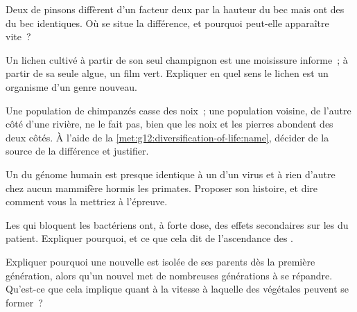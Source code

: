 \begin{exercise}[$\star\star$]\label{exo:g12:diversification-of-life:9}
Deux  de pinsons diffèrent d'un facteur deux par la hauteur du
bec mais ont des  du bec identiques. Où se situe la différence, et
pourquoi peut-elle apparaître vite~?
\end{exercise}

\begin{exercise}[$\star\star$]\label{exo:g12:diversification-of-life:10}
Un lichen cultivé à partir de son seul champignon est une moisissure
informe~; à partir de sa seule algue, un film vert. Expliquer en quel
sens le lichen est un organisme d'un genre nouveau.
\end{exercise}

\begin{exercise}[$\star\star$]\label{exo:g12:diversification-of-life:11}
Une population de chimpanzés casse des noix~; une population voisine,
de l'autre côté d'une rivière, ne le fait pas, bien que les noix et les
pierres abondent des deux côtés. À l'aide de la
\cref{met:g12:diversification-of-life:name}, décider de la source de la
différence et justifier.
\end{exercise}

\begin{exercise}[$\star\star\star$]\label{exo:g12:diversification-of-life:12}
Un  du génome humain est presque identique à un  d'un virus et
à rien d'autre chez aucun mammifère hormis les primates. Proposer son
histoire, et dire comment vous la mettriez à l'épreuve.
\end{exercise}

\begin{exercise}[$\star\star\star$]\label{exo:g12:diversification-of-life:13}
Les  qui bloquent les  bactériens ont, à forte
dose, des effets secondaires sur les  du patient.
Expliquer pourquoi, et ce que cela dit de l'ascendance des
.
\end{exercise}

\begin{exercise}[$\star\star\star$]\label{exo:g12:diversification-of-life:14}
Expliquer pourquoi une nouvelle   est isolée de ses
parents dès la première génération, alors qu'un nouvel  met de
nombreuses générations à se répandre. Qu'est-ce que cela implique
quant à la vitesse à laquelle des  végétales peuvent se former~?
\end{exercise}

